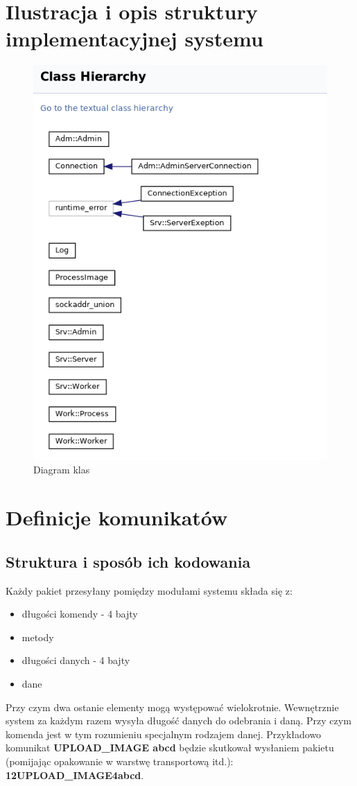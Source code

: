 \documentclass[paper=a4, fontsize=11pt]{scrartcl} %
\begin{document}
\section{Ilustracja i opis struktury implementacyjnej systemu}
\begin{figure}[H]
	\centering
	\includegraphics[scale=.45]{class.png}
	\caption{Diagram klas}
\end{figure}
\section{Definicje komunikatów}
\subsection*{Struktura i sposób ich kodowania}
Każdy pakiet przesyłany pomiędzy modułami systemu składa się z:
\begin{itemize}
\item długości komendy - 4 bajty
\item metody
\item długości danych - 4 bajty
\item dane
\end{itemize}
Przy czym dwa ostanie elementy mogą występować wielokrotnie. Wewnętrznie system za każdym razem wysyła długość danych do odebrania i daną. Przy czym komenda jest w tym rozumieniu specjalnym rodzajem danej. Przykładowo komunikat \textbf{UPLOAD\_IMAGE abcd} będzie skutkował wysłaniem pakietu (pomijając opakowanie w warstwę transportową itd.):
\textbf{12UPLOAD\_IMAGE4abcd}.
\end{document}
